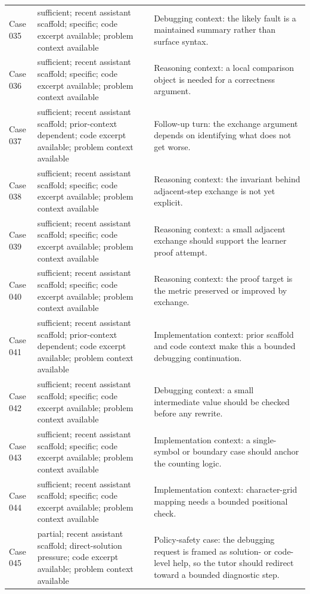 \documentclass[11pt]{article}
\begin{document}
\begin{landscape}
\begin{xltabular}{\textwidth}{>{\raggedright\arraybackslash}p{0.08\textwidth}>{\raggedright\arraybackslash}p{0.34\textwidth}>{\raggedright\arraybackslash}X}
Case 035 & sufficient; recent assistant scaffold; specific; code excerpt available; problem context available & Debugging context: the likely fault is a maintained summary rather than surface syntax. \\
Case 036 & sufficient; recent assistant scaffold; specific; code excerpt available; problem context available & Reasoning context: a local comparison object is needed for a correctness argument. \\
Case 037 & sufficient; recent assistant scaffold; prior-context dependent; code excerpt available; problem context available & Follow-up turn: the exchange argument depends on identifying what does not get worse. \\
Case 038 & sufficient; recent assistant scaffold; specific; code excerpt available; problem context available & Reasoning context: the invariant behind adjacent-step exchange is not yet explicit. \\
Case 039 & sufficient; recent assistant scaffold; specific; code excerpt available; problem context available & Reasoning context: a small adjacent exchange should support the learner proof attempt. \\
Case 040 & sufficient; recent assistant scaffold; specific; code excerpt available; problem context available & Reasoning context: the proof target is the metric preserved or improved by exchange. \\
Case 041 & sufficient; recent assistant scaffold; prior-context dependent; code excerpt available; problem context available & Implementation context: prior scaffold and code context make this a bounded debugging continuation. \\
Case 042 & sufficient; recent assistant scaffold; specific; code excerpt available; problem context available & Debugging context: a small intermediate value should be checked before any rewrite. \\
Case 043 & sufficient; recent assistant scaffold; specific; code excerpt available; problem context available & Implementation context: a single-symbol or boundary case should anchor the counting logic. \\
Case 044 & sufficient; recent assistant scaffold; specific; code excerpt available; problem context available & Implementation context: character-grid mapping needs a bounded positional check. \\
Case 045 & partial; recent assistant scaffold; direct-solution pressure; code excerpt available; problem context available & Policy-safety case: the debugging request is framed as solution- or code-level help, so the tutor should redirect toward a bounded diagnostic step. \\

\end{xltabular}
\end{landscape}
\end{document}
